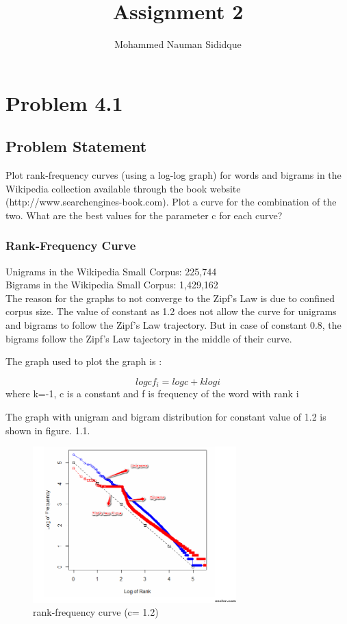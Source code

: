 \documentclass[12pt]{report}
\author{Mohammed Nauman Sididque}
\title{Assignment 2 }
\begin{document}
\maketitle
\tableofcontents
\chapter{Problem 4.1}
\section{Problem Statement}
Plot rank-frequency curves (using a log-log graph) for words and bigrams in the Wikipedia collection available through the book website (http://www.searchengines-book.com). Plot a curve for the combination of the two. What are the best values for the parameter c for each curve?
\subsection{Rank-Frequency Curve}

Unigrams in the Wikipedia Small Corpus: 225,744\\
Bigrams in the Wikipedia Small Corpus: 1,429,162\\

The reason for the graphs to not converge to the Zipf's Law is due to confined corpus size. The value of constant as 1.2 does not allow the curve for unigrams and bigrams to follow the Zipf's Law trajectory. But in case of constant 0.8, the bigrams follow the Zipf's Law tajectory in the middle of their curve.

The graph used to plot the graph is :

\[log cf_i = log c + k log i\] where k=-1, c is a constant and f is frequency of the word with rank i

The graph with unigram and bigram distribution for constant value of 1.2 is shown in figure. 1.1.  

\begin{figure}[ht] 
  \centering
  \includegraphics[width=0.7\textwidth]{Problem41.png}
  \caption{ rank-frequency curve (c= 1.2)}
  \label{fig:1}
\end{figure}
\end{document}
